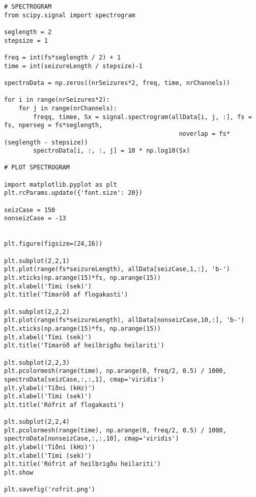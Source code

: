 \documentclass[11pt]{article}
\begin{document}
\begin{verbatim}
# SPECTROGRAM
from scipy.signal import spectrogram

seglength = 2
stepsize = 1

freq = int(fs*seglength / 2) + 1
time = int(seizureLength / stepsize)-1

spectroData = np.zeros((nrSeizures*2, freq, time, nrChannels))

for i in range(nrSeizures*2):
    for j in range(nrChannels):
        freqq, timee, Sx = signal.spectrogram(allData[i, j, :], fs = fs, nperseg = fs*seglength,
                                                noverlap = fs*(seglength - stepsize))
        spectroData[i, :, :, j] = 10 * np.log10(Sx)

# PLOT SPECTROGRAM

import matplotlib.pyplot as plt
plt.rcParams.update({'font.size': 20})

seizCase = 150
nonseizCase = -13


plt.figure(figsize=(24,16))

plt.subplot(2,2,1)
plt.plot(range(fs*seizureLength), allData[seizCase,1,:], 'b-')
plt.xticks(np.arange(15)*fs, np.arange(15))
plt.xlabel('Tími (sek)')
plt.title('Tímaröð af flogakasti')

plt.subplot(2,2,2)
plt.plot(range(fs*seizureLength), allData[nonseizCase,10,:], 'b-')
plt.xticks(np.arange(15)*fs, np.arange(15))
plt.xlabel('Tími (sek)')
plt.title('Tímaröð af heilbrigðu heilariti')

plt.subplot(2,2,3)
plt.pcolormesh(range(time), np.arange(0, freq/2, 0.5) / 1000, spectroData[seizCase,:,:,1], cmap='viridis')
plt.ylabel('Tíðni (kHz)')
plt.xlabel('Tími (sek)')
plt.title('Rófrit af flogakasti')

plt.subplot(2,2,4)
plt.pcolormesh(range(time), np.arange(0, freq/2, 0.5) / 1000, spectroData[nonseizCase,:,:,10], cmap='viridis')
plt.ylabel('Tíðni (kHz)')
plt.xlabel('Tími (sek)')
plt.title('Rófrit af heilbrigðu heilariti')
plt.show

plt.savefig('rofrit.png')
\end{verbatim}
\newpage
\end{document}
